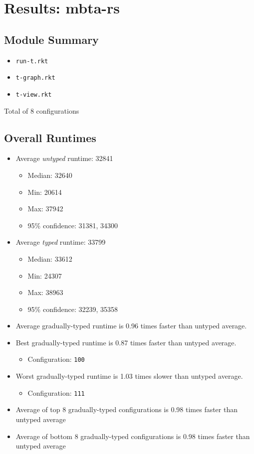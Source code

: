 \documentclass{article}
\newcommand{\mono}[1]{\texttt{#1}}
\begin{document}
\section{Results: mbta-rs}

\subsection{Module Summary}
\begin{itemize}
\item \mono{run-t.rkt}
\item \mono{t-graph.rkt}
\item \mono{t-view.rkt}\end{itemize}
Total of 8 configurations

\subsection{Overall Runtimes}
\begin{itemize}
\item Average \emph{untyped} runtime: 32841
  \begin{itemize}
  \item Median: 32640
  \item Min: 20614
  \item Max: 37942
  \item 95\% confidence: 31381, 34300
  \end{itemize}
\item Average \emph{typed} runtime: 33799
  \begin{itemize}
  \item Median: 33612
  \item Min: 24307
  \item Max: 38963
  \item 95\% confidence: 32239, 35358
  \end{itemize}
\item Average gradually-typed runtime is 0.96 times faster than untyped average.
\item Best gradually-typed runtime is 0.87 times faster than untyped average.
\begin{itemize}\item Configuration: \mono{100}\end{itemize}
\item Worst gradually-typed runtime is 1.03 times slower than untyped average.
\begin{itemize}\item Configuration: \mono{111}\end{itemize}
\item Average of top 8 gradually-typed configurations is 0.98 times faster than untyped average
\item Average of bottom 8 gradually-typed configurations is 0.98 times faster than untyped average
\end{itemize}
\end{document}

